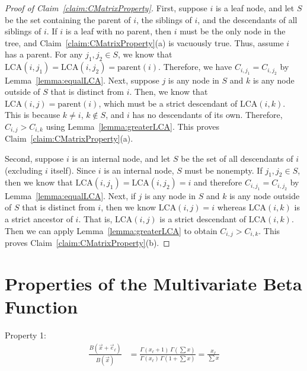 \documentclass{article}
\theoremstyle{definition}
\begin{document}
\begin{proof}[Proof of Claim~\ref{claim:CMatrixProperty}]
First, suppose $i$ is a leaf node, and let $S$ be the set containing the parent of $i$, the siblings of $i$, and the descendants of all siblings of $i$.
If $i$ is a leaf with no parent, then $i$ must be the only node in the tree, and Claim~\ref{claim:CMatrixProperty}(a) is vacuously true.
Thus, assume $i$ has a parent.
For any $j_1, j_2 \in S$, we know that $\text{LCA}(i, j_1) = \text{LCA}(i, j_2) = \text{parent}(i)$.
Therefore, we have $C_{i,j_1} = C_{i,j_2}$ by Lemma~\ref{lemma:equalLCA}.
Next, suppose $j$ is any node in $S$ and $k$ is any node outside of $S$ that is distinct from $i$.
Then, we know that $\text{LCA}(i,j) = \text{parent}(i)$, which must be a strict descendant of $\text{LCA}(i,k)$.
This is because $k \neq i$, $k \notin S$, and $i$ has no descendants of its own.
Therefore, $C_{i,j} > C_{i,k}$ using Lemma~\ref{lemma:greaterLCA}.
This proves Claim~\ref{claim:CMatrixProperty}(a).

Second, suppose $i$ is an internal node, and let $S$ be the set of all descendants of $i$ (excluding $i$ itself).
Since $i$ is an internal node, $S$ must be nonempty.
If $j_1, j_2 \in S$, then we know that $\text{LCA}(i, j_1) = \text{LCA}(i, j_2) = i$ and therefore $C_{i,j_1} = C_{i,j_2}$ by Lemma~\ref{lemma:equalLCA}.
Next, if $j$ is any node in $S$ and $k$ is any node outside of $S$ that is distinct from $i$, then we know $\text{LCA}(i,j) = i$ whereas $\text{LCA}(i,k)$ is a strict ancestor of $i$.
That is, $\text{LCA}(i,j)$ is a strict descendant of $\text{LCA}(i,k)$.
Then we can apply Lemma~\ref{lemma:greaterLCA} to obtain $C_{i,j} > C_{i,k}$.
This proves Claim~\ref{claim:CMatrixProperty}(b).
\end{proof}


\appendix
\section{Properties of the Multivariate Beta Function}

Property 1:
\begin{align*}
\frac{B(\vec x + \vec e_\ell)}{B(\vec x)}
&= \frac{\Gamma(x_\ell + 1) \, \Gamma(\sum x)}
        {\Gamma(x_\ell) \, \Gamma(1 + \sum x)}
= \frac{x_\ell}{\sum x}
\end{align*}
\end{document}
